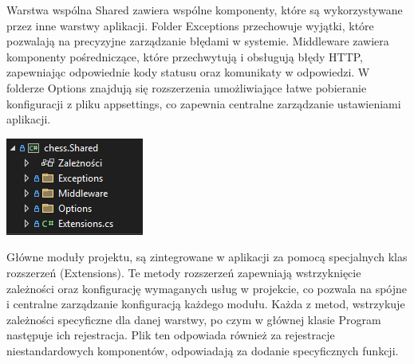 \documentclass[12pt,a4paper]{article}
\begin{document}
\begin{minipage}[t]{0.45\textwidth}
    \vspace{0pt}
    \justifying 
    \noindent
    Warstwa wspólna Shared zawiera wspólne komponenty, które są wykorzystywane przez inne warstwy aplikacji. Folder Exceptions przechowuje wyjątki, które pozwalają na precyzyjne zarządzanie błędami w systemie. Middleware zawiera komponenty pośredniczące, które przechwytują i obsługują błędy HTTP, zapewniając odpowiednie kody statusu oraz komunikaty w odpowiedzi. W folderze Options znajdują się rozszerzenia umożliwiające łatwe pobieranie konfiguracji z pliku appsettings, co zapewnia centralne zarządzanie ustawieniami aplikacji.
\end{minipage}
\hfill
\begin{minipage}[t]{0.45\textwidth}
    \vspace{0pt}
    \centering
    \includegraphics[width=\linewidth]{images/struktura_back_shared.png} 
\end{minipage}
\vspace{0.5cm}

\noindent
Główne moduły projektu, są zintegrowane w aplikacji za pomocą specjalnych klas rozszerzeń (Extensions). Te metody rozszerzeń zapewniają wstrzyknięcie zależności oraz konfigurację wymaganych usług w projekcie, co pozwala na spójne i centralne zarządzanie konfiguracją każdego modułu. Każda z metod, wstrzykuje zależności specyficzne dla danej warstwy, po czym w głównej klasie Program następuje ich rejestracja. Plik ten odpowiada również za rejestracje niestandardowych komponentów, odpowiadają za dodanie specyficznych funkcji.
\end{document}
